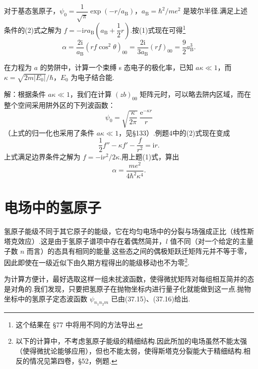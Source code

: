 \begin{xiti}
对于基态氢原子，$\psi_0=\dfrac{1}{\sqrt{\pi}}\exp(-r/a_{\mathrm{B}})$，$a_{\mathrm{B}}=\hbar^{2}/me^{2}$ 是玻尔半径.满足上述条件的(2)式之解为 $f=-\mathrm{i}ra_{\mathrm{B}}\left(a_{\mathrm{B}}+\dfrac{1}{2}r\right)$.按(1)式现在可得\footnote{这个结果在 §77 中将用不同的方法导出.}
\begin{equation*}
  \alpha=\frac{2\mathrm{i}}{a_{\mathrm{B}}}(rf\cos^{2}\theta)_{00}
  =\frac{2\mathrm{i}}{3a_{\mathrm{B}}}(rf)_{00}
  =\frac{9}{2}a_{\mathrm{B}}^{3}.
\end{equation*}

\quad 在力程为 $a$ 的势阱中，计算一个束缚 s 态电子的极化率，已知 $a\kappa\ll1$，而 $\kappa=\sqrt{2m|E_0|}/\hbar$，$E_0$ 为电子结合能.

解：根据条件 $a\kappa\ll1$，我们在计算 $(zb)_{00}$ 矩阵元时，可以略去阱内区域，而在整个空间采用阱外区的下列波函数：
\begin{equation*}
  \psi_0=\sqrt{\frac{\kappa}{2\pi}}\;\frac{\mathrm{e}^{-\kappa r}}{r}
\end{equation*}
（上式的归一化也采用了条件 $a\kappa\ll1$，见§133）.例题4中的(2)式现在变成
\begin{equation*}
  \frac{1}{2}f''-\kappa f'-\frac{f}{r^{2}}=\mathrm{i}r.
\end{equation*}
上式满足边界条件之解为 $f=-\mathrm{i}r^{2}/2\kappa$.用上题(1)式，算出
\begin{equation*}
  \alpha=\frac{me^{2}}{4\hbar^{2}\kappa^{4}}.
\end{equation*}

\end{xiti}
\renewcommand{\theequation}{\arabic{section}.\arabic{equation}}%

\section{电场中的氢原子}

氢原子能级不同于其它原子的能级，它在均匀电场中的分裂与场强成正比（线性斯塔克效应）.这是由于氢原子谱项中存在着偶然简并，$l$ 值不同（对一个给定的主量子数 $n$ 而言）的态具有相同的能量.这些态之间的偶极矩跃迁矩阵元并不等于零，因此即使在一级近似下由久期方程得出的能级移动也不为零\footnote{以下的计算中，不考虑氢原子能级的精细结构.因此所加的电场虽然不能太强（使得微扰论能够应用），但也不能太弱，使得斯塔克分裂能大于精细结构.相反的情况见第四卷，§52，例题.}.

为计算方便计，最好选取这样一组未扰波函数，使得微扰矩阵对每组相互简并的态是对角的.我们发现，只要把氢原子在抛物坐标内进行量子化就能做到这一点.抛物坐标中的氢原子定态波函数 $\psi_{n_1n_2m}$ 已由(37.15)、(37.16)给出.

